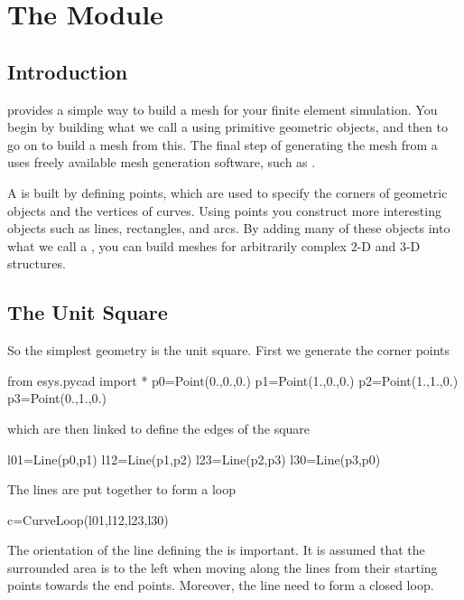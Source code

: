
%
%
%

\chapter{The \pycad Module}\label{PYCAD CHAP}

\section{Introduction}

\pycad provides a simple way to build a mesh for your finite element
simulation.  You begin by building what we call a  using
primitive geometric objects, and then to go on to build a mesh from
this.  The final step of generating the mesh from a 
uses freely available mesh generation software, such as \gmshextern.

A  is built by defining points, which are used to specify
the corners of geometric objects and the vertices of curves.  Using
points you construct more interesting objects such as lines,
rectangles, and arcs.  By adding many of these objects into what we
call a , you can build meshes for arbitrarily complex 2-D
and 3-D structures.

\section{The Unit Square}
So the simplest geometry is the unit square. First we generate the
corner points
\begin{python}
from esys.pycad import *
p0=Point(0.,0.,0.)
p1=Point(1.,0.,0.)
p2=Point(1.,1.,0.)
p3=Point(0.,1.,0.)
\end{python}
which are then linked to define the edges of the square
\begin{python}
l01=Line(p0,p1)
l12=Line(p1,p2)
l23=Line(p2,p3)
l30=Line(p3,p0)
\end{python}
The lines are put together to form a loop
\begin{python}
c=CurveLoop(l01,l12,l23,l30)
\end{python}
The orientation of the line defining the  is important. It is assumed that the surrounded
area is to the left when moving along the lines from their starting points towards the end points. Moreover,
the line need to form a closed loop.

